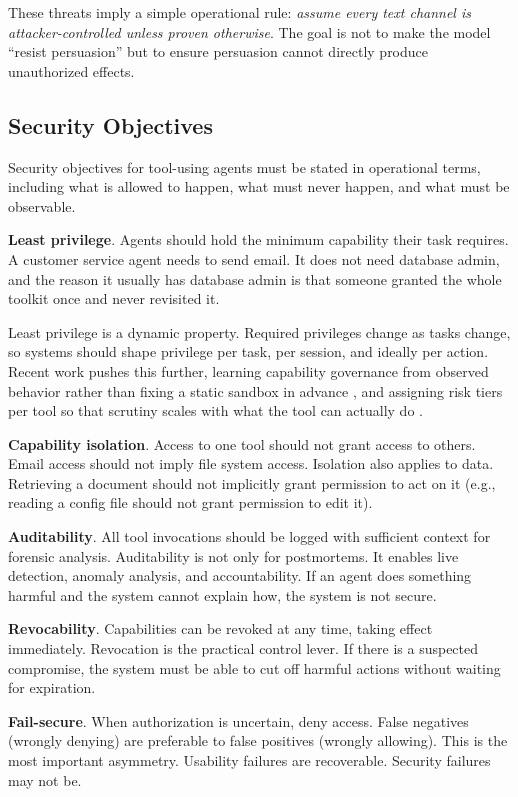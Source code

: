 These threats imply a simple operational rule: \emph{assume every text channel is attacker-controlled unless proven otherwise}. The goal is not to make the model ``resist persuasion'' but to ensure persuasion cannot directly produce unauthorized effects.

\subsection{Security Objectives}

Security objectives for tool-using agents must be stated in operational terms, including what is allowed to happen, what must never happen, and what must be observable.

\textbf{Least privilege}. Agents should hold the minimum capability their task
requires. A customer service agent needs to send email. It does not need database
admin, and the reason it usually has database admin is that someone granted the
whole toolkit once and never revisited it.

Least privilege is a dynamic property. Required privileges change as tasks change,
so systems should shape privilege per task, per session, and ideally per action.
Recent work pushes this further, learning capability governance from observed
behavior rather than fixing a static sandbox in advance
\cite{learnedgov2026}, and assigning risk tiers per tool so that scrutiny scales
with what the tool can actually do \cite{agentrim2026}.

\textbf{Capability isolation}. Access to one tool should not grant access to others. Email access should not imply file system access. Isolation also applies to data. Retrieving a document should not implicitly grant permission to act on it (e.g., reading a config file should not grant permission to edit it).

\textbf{Auditability}. All tool invocations should be logged with sufficient context for forensic analysis. Auditability is not only for postmortems. It enables live detection, anomaly analysis, and accountability. If an agent does something harmful and the system cannot explain how, the system is not secure.

\textbf{Revocability}. Capabilities can be revoked at any time, taking effect immediately. Revocation is the practical control lever. If there is a suspected compromise, the system must be able to cut off harmful actions without waiting for expiration.

\textbf{Fail-secure}. When authorization is uncertain, deny access. False negatives (wrongly denying) are preferable to false positives (wrongly allowing). This is the most important asymmetry. Usability failures are recoverable. Security failures may not be.

